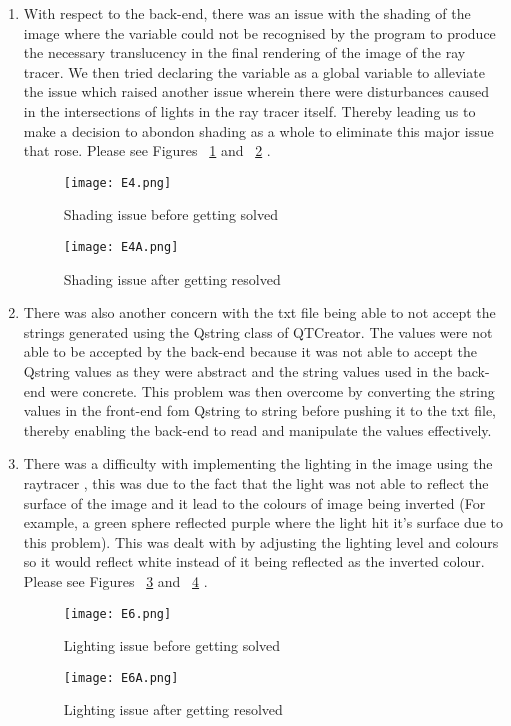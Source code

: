\documentclass{article}
\begin{document}
\begin{enumerate}
\item 	With respect to the back-end, there was an issue with the shading of the image where the variable could not be recognised by the program to produce the necessary translucency in the final rendering of the image of the ray tracer. We then tried declaring the variable as a global variable to alleviate the issue which raised another issue wherein there were disturbances caused in the intersections of lights in the  ray tracer itself. Thereby leading us to make a decision to abondon shading as a whole to eliminate this major issue that rose. Please see Figures ~\ref{point4a} and ~\ref{point4b} . 
\begin{figure}[h]
\centering
\texttt{[image: E4.png]}
\caption{Shading issue before getting solved \label{point4a}}
\end{figure}

\begin{figure}[h]
\centering
\texttt{[image: E4A.png]}
\caption{Shading issue after getting resolved \label{point4b}}
\end{figure}

\item 	There was also another concern with the txt file being able to not accept the strings generated using the Qstring class of QTCreator. The values were not able to be accepted by the back-end because it was not able to accept the Qstring values as they were abstract and the string values used in the back-end were concrete. This problem was then overcome by converting the string values in the front-end fom Qstring to string before pushing it to the txt file, thereby enabling the back-end to read and manipulate the values effectively.
\item 	There was a difficulty with implementing the lighting in the image using the raytracer , this was due to the fact that the light was not able to reflect the surface of the image and it lead to the colours of image being inverted (For example, a green sphere reflected purple where the light hit it’s surface due to this problem). This was dealt with by adjusting the lighting level and colours so it would reflect white instead of it being reflected as the inverted colour. Please see Figures ~\ref{point6a} and ~\ref{point6b} . 
\begin{figure}[!H]
\centering
\texttt{[image: E6.png]}
\caption{Lighting issue before getting solved \label{point6a}}
\end{figure}

\begin{figure}[!H]
\centering
\texttt{[image: E6A.png]}
\caption{Lighting issue after getting resolved \label{point6b}}
\end{figure}


\end{enumerate}
\end{document}
